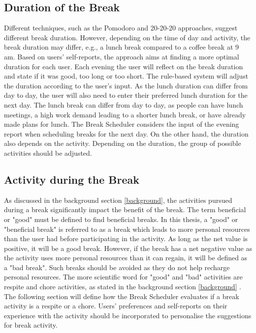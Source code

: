 \documentclass{hasel_thesis}
\begin{document}
\subsection{Duration of the Break}
Different techniques, such as the Pomodoro and 20-20-20 approaches, suggest different break duration. However, depending on the time of day and activity, the break duration may differ, e.g., a lunch break compared to a coffee break at 9 am. Based on users' self-reports, the approach aims at finding a more optimal duration for each user. Each evening the user will reflect on the break duration and state if it was good, too long or too short. The rule-based system will adjust the duration according to the user's input. As the lunch duration can differ from day to day, the user will also need to enter their preferred lunch duration for the next day. The lunch break can differ from day to day, as people can have lunch meetings, a high work demand leading to a shorter lunch break, or have already made plans for lunch. The Break Scheduler considers the input of the evening report when scheduling breaks for the next day. On the other hand, the duration also depends on the activity. Depending on the duration, the group of possible activities should be adjusted.

\subsection{Activity during the Break}
As discussed in the background section \ref{background}, the activities pursued during a break significantly impact the benefit of the break. The term beneficial or "good" must be defined to find beneficial breaks. In this thesis, a "good" or "beneficial break" is referred to as a break which leads to more personal resources than the user had before participating in the activity. As long as the net value is positive, it will be a good break. However, if the break has a net negative value as the activity uses more personal resources than it can regain, it will be defined as a "bad break". Such breaks should be avoided as they do not help recharge personal resources. 
The more scientific word for "good" and "bad" activities are respite and chore activities, as stated in the background section \ref{background} \cite{Trougakos.2009}. The following section will define how the Break Scheduler evaluates if a break activity is a respite or a chore. Users' preferences and self-reports on their experience with the activity should be incorporated to personalise the suggestions for break activity. 
\end{document}

